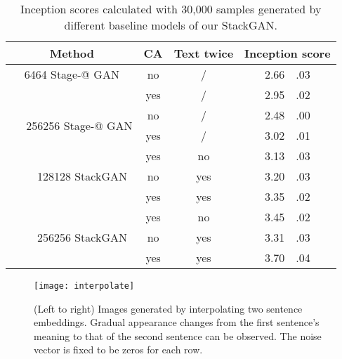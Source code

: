 \documentclass[10pt,twocolumn,letterpaper]{article}
\makeatletter
\newcommand{\Rmnum}[1]{\expandafter\@slowromancap\romannumeral #1@}
\makeatother
\begin{document}
\begin{table}
\begin{center}
\scriptsize
\begin{tabular}{|c|c|c|c|}
\hline
Method &CA &Text twice  &Inception score \\
\hline
6464 Stage-\Rmnum{1} GAN  &no    &/     &2.66~~.03   \\
                                  &yes   &/     &2.95~~.02   \\
\hline
\multirow{2}{3cm}{\,\,\,\,\,\,\,\,256256 Stage-\Rmnum{1} GAN}
                                  &no    &/     &2.48~~.00   \\
                                  &yes    &/     &3.02~~.01   \\
\hline
\multirow{3}{3cm}{\,\,\,\,\,\,\,\,\,\,\,128128 StackGAN}
                                  &yes   &no    &3.13~~.03  \\ 
                                  &no    &yes   &3.20~~.03  \\
                                  &yes   &yes   &3.35~~.02  \\
\hline
\multirow{3}{3cm}{\,\,\,\,\,\,\,\,\,\,\,256256 StackGAN}
                                  &yes   &no    &3.45~~.02  \\ 
                                  &no    &yes   &3.31~~.03  \\
                                  &yes   &yes   &3.70~~.04  \\
\hline
\end{tabular}
\end{center}
\vspace{-5pt}
    \caption{Inception scores calculated with 30,000 samples generated by different baseline models of our StackGAN.}
\label{tab:inception_score}
\vspace{-10pt}
\end{table}



\begin{figure}[bt]
\begin{center}
	\texttt{[image: interpolate]}
\end{center}
\vspace{-8pt}
   \caption{(Left to right) Images generated by interpolating two sentence embeddings. Gradual appearance changes from the first sentence's meaning to that of the second sentence can be observed. The noise vector  is fixed to be zeros for each row.}
\vspace{-10pt}
\label{fig:interpolate}
\end{figure}
\end{document}
